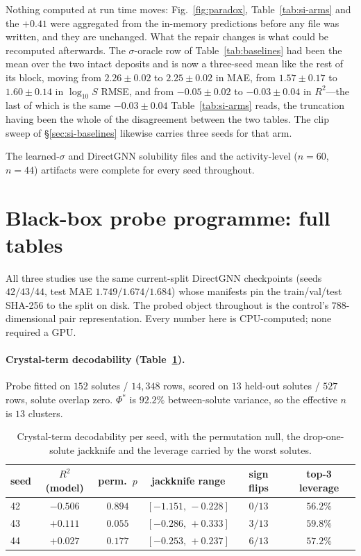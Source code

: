 Nothing computed at run time moves: Fig.~\ref{fig:paradox}, Table~\ref{tab:si-arms} and the $+0.41$
were aggregated from the in-memory predictions before any file was written, and they are unchanged.
What the repair changes is what could be recomputed afterwards. The $\sigma$-oracle row of
Table~\ref{tab:baselines} had been the mean over the two intact deposits and is now a three-seed
mean like the rest of its block, moving from $2.26\pm0.02$ to $2.25\pm0.02$ in MAE, from
$1.57\pm0.17$ to $1.60\pm0.14$ in $\log_{10}S$ RMSE, and from $-0.05\pm0.02$ to $-0.03\pm0.04$ in
$R^{2}$---the last of which is the same $-0.03\pm0.04$ Table~\ref{tab:si-arms} reads, the truncation
having been the whole of the disagreement between the two tables. The clip sweep of \S\ref{sec:si-baselines} likewise carries three seeds for that arm.

The learned-$\sigma$ and DirectGNN solubility files and the activity-level
($n{=}60$, $n{=}44$) artifacts were complete for every seed throughout.

\section{Black-box probe programme: full tables}
\label{sec:si-blackbox}
All three studies use the same current-split DirectGNN checkpoints (seeds $42/43/44$, test MAE
$1.749/1.674/1.684$) whose manifests pin the train/val/test SHA-256 to the split on disk. The probed
object throughout is the control's $788$-dimensional pair representation. Every
number here is CPU-computed; none required a GPU.

\paragraph{Crystal-term decodability (Table~\ref{tab:crystal-decode}).} Probe fitted on $152$ solutes / $14{,}348$ rows,
scored on $13$ held-out solutes / $527$ rows, solute overlap zero. $\Phi^{*}$ is $92.2\%$
between-solute variance, so the effective $n$ is $13$ clusters.

\begin{table}[t]
\centering\footnotesize
\begin{tabular}{lccccc}
\toprule
seed & $R^{2}$(model) & perm.\ $p$ & jackknife range & sign flips & top-3 leverage \\
\midrule
42 & $-0.506$ & $0.894$ & $[-1.151,\,-0.228]$ & $0/13$ & $56.2\%$ \\
43 & $+0.111$ & $0.055$ & $[-0.286,\,+0.333]$ & $3/13$ & $59.8\%$ \\
44 & $+0.027$ & $0.177$ & $[-0.253,\,+0.237]$ & $6/13$ & $57.2\%$ \\
\bottomrule
\end{tabular}
\caption[Crystal-term decodability per seed, with its nulls]{Crystal-term decodability per seed, with the permutation null, the drop-one-solute jackknife and the leverage carried by the worst solutes.}
\label{tab:crystal-decode}
\end{table}

